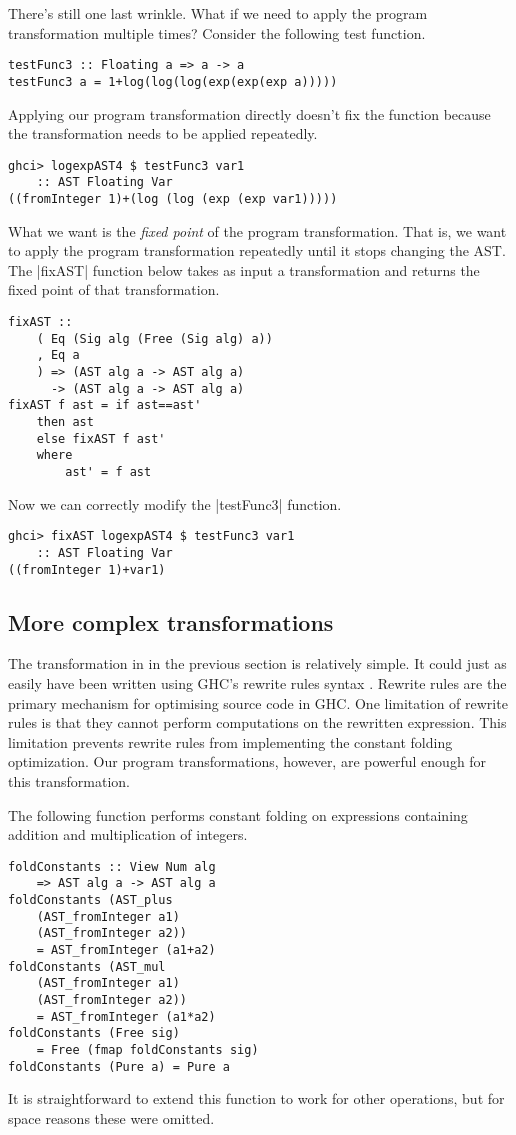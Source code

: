 \documentclass[preprint]{sigplanconf}
\theoremstyle{definition}
\begin{document}
There's still one last wrinkle.
What if we need to apply the program transformation multiple times?
Consider the following test function.
\begin{lstlisting}
testFunc3 :: Floating a => a -> a
testFunc3 a = 1+log(log(log(exp(exp(exp a)))))
\end{lstlisting}
Applying our program transformation directly doesn't fix the function because the transformation needs to be applied repeatedly.
\begin{lstlisting}
ghci> logexpAST4 $ testFunc3 var1
    :: AST Floating Var
((fromInteger 1)+(log (log (exp (exp var1)))))
\end{lstlisting}
What we want is the \emph{fixed point} of the program transformation.
That is, we want to apply the program transformation repeatedly until it stops changing the AST.
The |fixAST| function below takes as input a transformation and returns the fixed point of that transformation.
\begin{lstlisting}
fixAST ::
    ( Eq (Sig alg (Free (Sig alg) a))
    , Eq a
    ) => (AST alg a -> AST alg a)
      -> (AST alg a -> AST alg a)
fixAST f ast = if ast==ast'
    then ast
    else fixAST f ast'
    where
        ast' = f ast
\end{lstlisting}
Now we can correctly modify the |testFunc3| function.
\begin{lstlisting}
ghci> fixAST logexpAST4 $ testFunc3 var1
    :: AST Floating Var
((fromInteger 1)+var1)
\end{lstlisting}

\subsection{More complex transformations}

The transformation in in the previous section is relatively simple.
It could just as easily have been written using GHC's rewrite rules syntax \cite{jones2001playing}.
Rewrite rules are the primary mechanism for optimising source code in GHC.
One limitation of rewrite rules is that they cannot perform computations on the rewritten expression.
This limitation prevents rewrite rules from implementing the constant folding optimization.
Our program transformations, however, are powerful enough for this transformation.

The following function performs constant folding on expressions containing addition and multiplication of integers.
\begin{lstlisting}
foldConstants :: View Num alg
    => AST alg a -> AST alg a
foldConstants (AST_plus
    (AST_fromInteger a1)
    (AST_fromInteger a2))
    = AST_fromInteger (a1+a2)
foldConstants (AST_mul
    (AST_fromInteger a1)
    (AST_fromInteger a2))
    = AST_fromInteger (a1*a2)
foldConstants (Free sig)
    = Free (fmap foldConstants sig)
foldConstants (Pure a) = Pure a
\end{lstlisting}
It is straightforward to extend this function to work for other operations,
but for space reasons these were omitted.
\end{document}
